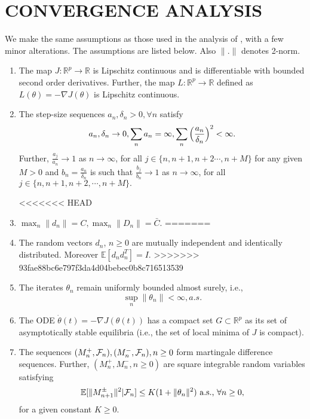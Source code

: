 \section{CONVERGENCE ANALYSIS}
\label{sec:convergenceresults}
We make the same assumptions as those used in the analysis of \cite{spall}, with a 
few minor alterations. The assumptions are listed below. Also $\|.\|$ denotes 2-norm.
\begin{enumerate}[label= \textbf{(A\arabic*)}]
 \item The map $J:\mathbb{R}^p \rightarrow \mathbb{R}$ is Lipschitz continuous and 
 is differentiable with bounded second order derivatives. Further, 
 the map $L:\mathbb{R}^p \rightarrow \mathbb{R}$ defined as 
 $L(\theta)=-\nabla J(\theta)$ is Lipschitz continuous.
 \item The step-size sequences $a_n, \delta_n >0, \forall n $  satisfy
 \begin{equation*}\label{stepsizes}
 a_n,\delta_n \rightarrow 0 , \sum_na_n=\infty,
 \sum_n \Big{(}\frac{a_n}{\delta_n}\Big{)}^2<\infty.
 \end{equation*}
 Further, $\frac{a_j}{a_n}\rightarrow 1$ as $n\rightarrow \infty$, for all
 $j \in \{n,n+1,n+2\cdots,n+M\}$ for any given $M>0$ and $b_n=\frac{a_n}{\delta_n}$ is 
 such that $\frac{b_j}{b_n}\rightarrow 1$ as $n\rightarrow \infty$, for all
 $j \in \{n,n+1,n+2,\cdots,n+M\}.$

<<<<<<< HEAD
 \item $\max_n \|d_n\|= C, \max_n \|D_n\|= \bar{C}$. 
=======
 \item The random vectors $d_n$, $n\geq0$ are mutually independent and identically
 distributed. Moreover $\mathbb{E}[d_nd_n^T]=I.$
>>>>>>> 93fae88bc6e797f3da4d04bebec0b8c716513539
 
 \item The iterates $\theta_n$ remain uniformly bounded almost surely, i.e.,
 $$ \sup_n\|\theta_n\|<\infty, a.s.$$

 \item The ODE $\dot{\theta}(t)=-\nabla J(\theta(t))$ has a compact set 
 $G \subset \mathbb{R}^p$ as its set of asymptotically stable equilibria
 (i.e., the set of local minima of $J$ is compact).
 
 
 \item The sequences $(M_{n}^{+},\mathcal{F}_n),(M_{n}^{-},\mathcal{F}_n), n\geq0 $ form martingale difference sequences.
 Further, $(M_{n}^{+},M_{n}^{-},n\geq0)$ are square integrable random variables satisfying
 $$\mathbb{E}[\|M_{n+1}^{\pm}\|^2|\mathcal{F}_n]\leq K(1+\|\theta_n\|^2) \text{ a.s., } \forall n\geq0,$$
 for a given constant $K \geq 0.$
 
\end{enumerate}
